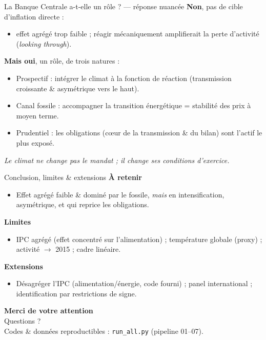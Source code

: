 \documentclass[11pt,aspectratio=169]{beamer}
\begin{document}
\begin{frame}{La Banque Centrale a-t-elle un rôle ? — réponse nuancée}
\textbf{\color{dauphblue}Non}, pas de cible d'inflation directe :
\begin{itemize}\small
\item effet agrégé trop faible ; réagir mécaniquement amplifierait la perte d'activité (\emph{looking through}).
\end{itemize}
\vspace{0.3em}
\textbf{\color{dauphblue}Mais oui}, un rôle, de trois natures :
\begin{itemize}\small
\item \alert{Prospectif} : intégrer le climat à la fonction de réaction (transmission croissante \& asymétrique vers le haut).
\item \alert{Canal fossile} : accompagner la transition énergétique = stabilité des prix à moyen terme.
\item \alert{Prudentiel} : les obligations (cœur de la transmission \& du bilan) sont l'actif le plus exposé.
\end{itemize}
\vfill
\centering\emph{Le climat ne change pas le mandat ; il change ses conditions d'exercice.}
\end{frame}

\begin{frame}{Conclusion, limites \& extensions}
\textbf{\color{dauphblue}À retenir}
\begin{itemize}\small
\item Effet agrégé faible \& dominé par le fossile, \emph{mais} en intensification, asymétrique, et qui reprice les obligations.
\end{itemize}
\textbf{\color{dauphblue}Limites}
\begin{itemize}\small
\item IPC agrégé (effet concentré sur l'alimentation) ; température globale (proxy) ; activité $\to$ 2015 ; cadre linéaire.
\end{itemize}
\textbf{\color{dauphblue}Extensions}
\begin{itemize}\small
\item Désagréger l'IPC (alimentation/énergie, code fourni) ; panel international ; identification par restrictions de signe.
\end{itemize}
\end{frame}

{
\begin{frame}[plain]
\begin{center}
{\color{dauphblue}\Large\textbf{Merci de votre attention}}\\[0.6em]
{\large Questions ?}\\[1em]
\small Codes \& données reproductibles : \texttt{run\_all.py} (pipeline 01--07).
\end{center}
\end{frame}}
\end{document}
